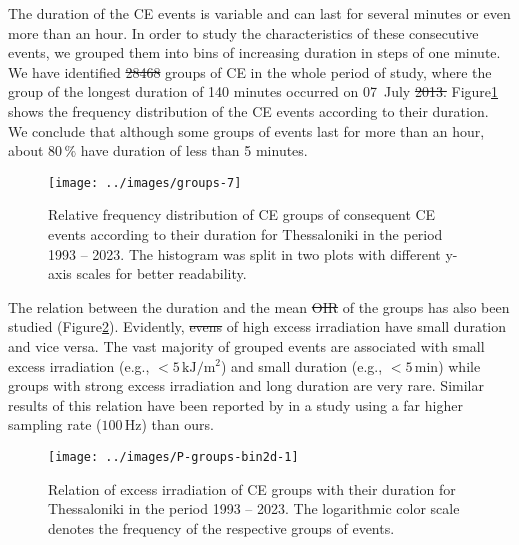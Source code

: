 \documentclass[preprint, 5p,
authoryear]{elsarticle} %
\providecommand{\DIFaddtex}[1]{{\protect\color{blue}\uwave{#1}}} %
\providecommand{\DIFdeltex}[1]{{\protect\color{red}\sout{#1}}}                      %
\providecommand{\DIFaddbegin}{} %
\providecommand{\DIFaddend}{} %
\providecommand{\DIFdelbegin}{} %
\providecommand{\DIFdelend}{} %
\providecommand{\DIFadd}[1]{\texorpdfstring{\DIFaddtex{#1}}{#1}} %
\providecommand{\DIFdel}[1]{\texorpdfstring{\DIFdeltex{#1}}{}} %
\newcommand{\DIFscaledelfig}{0.5}
\newlength{\DIFdelgraphicswidth} %
\newlength{\DIFdelgraphicsheight} %
\newcommand{\DIFaddincludegraphics}[2][]{{\color{blue}\fbox{\DIFOincludegraphics[#1]{#2}}}} %
\newcommand{\DIFdelincludegraphics}[2][]{%
\sbox{\DIFdelgraphicsbox}{\DIFOincludegraphics[#1]{#2}}%
\settoboxwidth{\DIFdelgraphicswidth}{\DIFdelgraphicsbox} %
\settoboxtotalheight{\DIFdelgraphicsheight}{\DIFdelgraphicsbox} %
\scalebox{\DIFscaledelfig}{%
\parbox[b]{\DIFdelgraphicswidth}{\usebox{\DIFdelgraphicsbox}\\[-\baselineskip] \rule{\DIFdelgraphicswidth}{0em}}\llap{\resizebox{\DIFdelgraphicswidth}{\DIFdelgraphicsheight}{%
\setlength{\unitlength}{\DIFdelgraphicswidth}%
\begin{picture}(1,1)%
\thicklines\linethickness{2pt} %
{\color[rgb]{1,0,0}\put(0,0){\framebox(1,1){}}}%
{\color[rgb]{1,0,0}\put(0,0){\line( 1,1){1}}}%
{\color[rgb]{1,0,0}\put(0,1){\line(1,-1){1}}}%
\end{picture}%
}\hspace*{3pt}}} %
} %
\DeclareRobustCommand{\DIFaddbegin}{\DIFOaddbegin \let\includegraphics\DIFaddincludegraphics} %
\DeclareRobustCommand{\DIFaddend}{\DIFOaddend \let\includegraphics\DIFOincludegraphics} %
\DeclareRobustCommand{\DIFdelbegin}{\DIFOdelbegin \let\includegraphics\DIFdelincludegraphics} %
\DeclareRobustCommand{\DIFdelend}{\DIFOaddend \let\includegraphics\DIFOincludegraphics} %
\begin{document}
The duration of the CE events is variable and can last for several
minutes or even more than an hour. In order to study the characteristics
of these consecutive events, we grouped them into bins of increasing
duration in steps of one minute. We have identified \DIFdelbegin \DIFdel{28468 }\DIFdelend \DIFaddbegin \DIFadd{28062 }\DIFaddend groups of CE
in the whole period of study, where the group of the longest duration of
140 minutes occurred on 07~July \DIFdelbegin \DIFdel{2013.
}\DIFdelend \DIFaddbegin \DIFadd{2013 in a SZA range of \(52.1^\circ\) --
\(77.9^\circ\). }\DIFaddend Figure\nobreakspace{}\ref{fig:ceg-duration-distribution}
shows the frequency distribution of the CE events according to their
duration. We conclude that although some groups of events last for more
than an hour, about \(80\,\%\) have duration of less than 5 minutes.

\begin{figure}

{\centering \texttt{[image: ../images/groups-7]} 

}

\caption{Relative frequency distribution of CE groups of consequent CE events according to their duration for Thessaloniki in the period 1993 -- 2023. The histogram was split in two plots with different y-axis scales for better readability.}\label{fig:ceg-duration-distribution}
\end{figure}

The relation between the duration and the mean \DIFdelbegin \DIFdel{OIR }\DIFdelend \DIFaddbegin \DIFadd{OI }\DIFaddend of the groups has also
been studied (Figure\nobreakspace{}\ref{fig:group-2d}). Evidently,
\DIFdelbegin \DIFdel{evens }\DIFdelend \DIFaddbegin \DIFadd{events }\DIFaddend of high excess irradiation have small duration and vice versa.
The vast majority of grouped events are associated with small excess
irradiation (e.g., \(<5\,\text{kJ}/\text{m}^2\)) and small duration
(e.g., \(<5\,\text{min}\)) while groups with strong excess irradiation
and long duration are very rare. Similar results of this relation have
been reported by \citet{Zhang2018} in a study using a far higher
sampling rate (\(100\,\text{Hz}\)) than ours.

\begin{figure}

{\centering \texttt{[image: ../images/P-groups-bin2d-1]} 

}

\caption{Relation of excess irradiation of CE groups with their duration for Thessaloniki in the period 1993 -- 2023. The logarithmic color scale denotes the frequency of the respective groups of events.}\label{fig:group-2d}
\end{figure}
\end{document}

